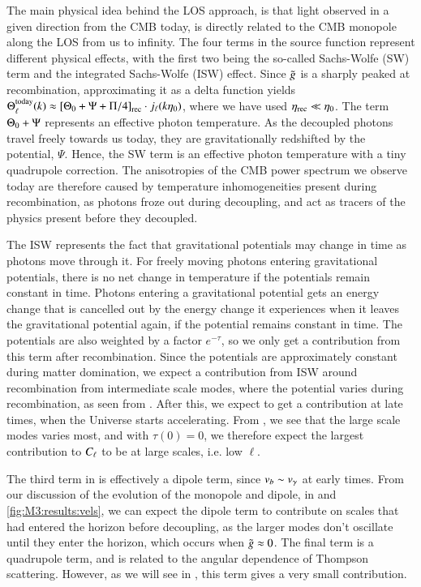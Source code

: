 The main physical idea behind the LOS approach, is that light observed in a given direction from the CMB today, is directly related to the CMB monopole along the LOS from us to infinity. The four terms in the source function represent different physical effects, with the first two being the so-called Sachs-Wolfe (SW) term and the integrated Sachs-Wolfe (ISW) effect. Since $\tilde{g}$ is a sharply peaked at recombination, approximating it as a delta function yields $\Theta_\ell^\mathrm{today}(k)\approx \left[ \Theta_0 + \Psi + \Pi/4 \right]_\mathrm{rec}\cdot j_\ell(k\eta_0)$, where we have used $\eta_\mathrm{rec}\ll\eta_0$. The term $\Theta_0+\Psi$ represents an effective photon temperature. As the decoupled photons travel freely towards us today, they are gravitationally redshifted by the potential, $\Psi$. Hence, the SW term is an effective photon temperature with a tiny quadrupole correction. The anisotropies of the CMB power spectrum we observe today are therefore caused by temperature inhomogeneities present during recombination, as photons froze out during decoupling, and act as tracers of the physics present before they decoupled.  

The ISW represents the fact that gravitational potentials may change in time as photons move through it. For freely moving photons entering gravitational potentials, there is no net change in temperature if the potentials remain constant in time. Photons entering a gravitational potential gets an energy change that is cancelled out by the energy change it experiences when it leaves the gravitational potential again, if the potential remains constant in time.  The potentials are also weighted by a factor $e^{-\tau}$, so we only get a contribution from this term after recombination. Since the potentials are approximately constant during matter domination, we expect a contribution from ISW around recombination from intermediate scale modes, where the potential varies during recombination, as seen from . After this, we expect to get a contribution at late times, when the Universe starts accelerating. From , we see that the large scale modes varies most, and with $\tau(0)=0$, we therefore expect the largest contribution to $C_\ell$ to be at large scales, i.e. low $\ell$.  

The third term in  is effectively a dipole term, since $v_b\sim v_\gamma$ at early times. From our discussion of the evolution of the monopole and dipole, in  and \ref{fig:M3:results:vels}, we can expect the dipole term to contribute on scales that had entered the horizon before decoupling, as the larger modes don't oscillate until they enter the horizon, which occurs when $\tilde{g}\approx0$. The final term is a quadrupole term, and is related to the angular dependence of Thompson scattering. However, as we will see in , this term gives a very small contribution.

